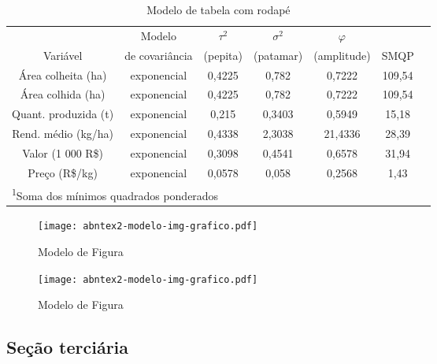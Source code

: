 \documentclass[
	12pt,				%
	openright,			%
	oneside,			%
	a4paper,			%
	english,			%
	french,				%
	spanish,			%
	brazil				%
	]{abntex2}
\begin{document}
\begin{table}[htb]
	\centering
	\caption{Modelo de tabela com rodapé}
	\label{my-label}
	\begin{tabular}{ccccccc}  %
		\hline
		& Modelo  & $\tau^2$  & $\sigma^2$  & $\varphi$  &   \\
		Variável             &  de covariância &  (pepita) &  (patamar) &  (amplitude) &  SMQP \footnotemark[1] \\
		\hline
		Área colheita (ha)   & exponencial           & 0,4225   & 0,782     & 0,7222      & 109,54 \\
		Área colhida (ha)    & exponencial           & 0,4225   & 0,782     & 0,7222      & 109,54 \\
		Quant. produzida (t) & exponencial           & 0,215    & 0,3403    & 0,5949      & 15,18  \\
		Rend. médio (kg/ha)  & exponencial           & 0,4338   & 2,3038    & 21,4336     & 28,39  \\
		Valor (1 000 R\$)    & exponencial           & 0,3098   & 0,4541    & 0,6578      & 31,94  \\
		Preço (R\$/kg)       & exponencial           & 0,0578   & 0,058     & 0,2568      & 1,43   \\
		\hline
		\multicolumn{6}{l}{\textsuperscript{1}\footnotesize{Soma dos mínimos quadrados ponderados }}
		
	\end{tabular}
	
\end{table}

\begin{figure}[htb]
	\caption{\label{fig_grafico} Modelo de Figura}
	\begin{center}
		\texttt{[image: abntex2-modelo-img-grafico.pdf]}
	\end{center}
\end{figure}

\lipsum[14]

\begin{figure}[htb]
	\caption{\label{fig_grafico} Modelo de Figura}
	\begin{center}
		\texttt{[image: abntex2-modelo-img-grafico.pdf]}
	\end{center}
\end{figure}

\subsection{Seção terciária}
\end{document}
